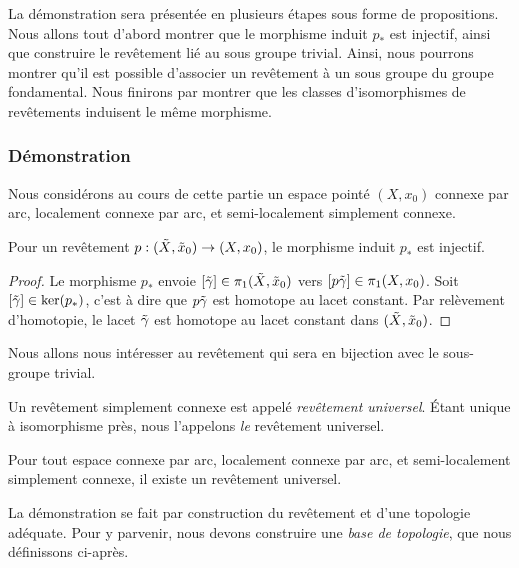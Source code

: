La démonstration sera présentée en plusieurs étapes sous forme de propositions. Nous allons tout d'abord montrer que le morphisme induit $p_\ast$ est injectif, ainsi que construire le revêtement lié au sous groupe trivial. Ainsi, nous pourrons montrer qu'il est possible d'associer un revêtement à un sous groupe du groupe fondamental. Nous finirons par montrer que les classes d'isomorphismes de revêtements induisent le même morphisme.

\subsubsection{Démonstration}

Nous considérons au cours de cette partie un espace pointé $(X,x_0)$ connexe par arc, localement connexe par arc, et semi-localement simplement connexe.

\begin{proposition}
Pour un revêtement $p:(\Tilde{X},\Tilde{x}_0)\to(X,x_0)$, le morphisme induit $p_\ast$ est injectif.
\end{proposition}
\begin{proof}
Le morphisme $p_\ast$ envoie $[\Tilde{\gamma}]\in\pi_1(\Tilde{X},\Tilde{x}_0)$ vers $[p\Tilde{\gamma}]\in\pi_1(X,x_0)$. Soit $[\Tilde{\gamma}]\in\ker(p_\ast)$, c'est à dire que $p\Tilde{\gamma}$ est homotope au lacet constant. Par relèvement d'homotopie, le lacet $\Tilde{\gamma}$ est homotope au lacet constant dans $(\Tilde{X},\Tilde{x}_0)$.
\end{proof}

Nous allons nous intéresser au revêtement qui sera en bijection avec le sous-groupe trivial.

\begin{definition}
Un revêtement simplement connexe est appelé \emph{revêtement universel}. Étant unique à isomorphisme près, nous l'appelons \emph{le} revêtement universel.
\end{definition}

\begin{proposition}
Pour tout espace connexe par arc, localement connexe par arc, et semi-localement simplement connexe, il existe un revêtement universel.
\end{proposition}

La démonstration se fait par construction du revêtement et d'une topologie adéquate. Pour y parvenir, nous devons construire une \emph{base de topologie}, que nous définissons ci-après.

